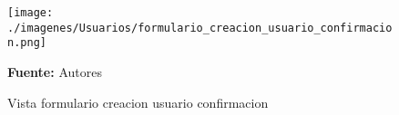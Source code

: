 \begin{figure}[!htb]
  \begin{center}
\texttt{[image: ./imagenes/Usuarios/formulario\_creacion\_usuario\_confirmacion.png]}
    \caption{Vista formulario creacion usuario confirmacion}
    \label{fig:Vista_formulario_creacion_usuario_confirmacion}
    \textbf{Fuente:}  Autores
  \end{center}
\end{figure}
